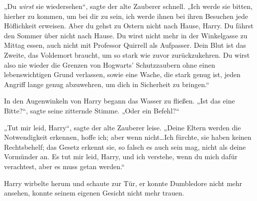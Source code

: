„Du \emph{wirst} sie wiedersehen“, sagte der alte Zauberer schnell. „Ich werde sie bitten, hierher zu kommen, um bei dir zu sein, ich werde ihnen bei ihren Besuchen jede Höflichkeit erweisen. Aber du gehst zu Ostern nicht nach Hause, Harry. Du fährst den Sommer über nicht nach Hause. Du wirst nicht mehr in der Winkelgasse zu Mittag essen, auch nicht mit Professor Quirrell als Aufpasser. Dein Blut ist das Zweite, das Voldemort braucht, um so stark wie zuvor zurückzukehren. Du wirst also nie wieder die Grenzen von Hogwarts’ Schutzzaubern ohne einen lebenswichtigen Grund verlassen, sowie eine Wache, die stark genug ist, jeden Angriff lange genug abzuwehren, um dich in Sicherheit zu bringen.“

In den Augenwinkeln von Harry begann das Wasser zu fließen. „Ist das eine Bitte?“, sagte seine zitternde Stimme. „Oder ein Befehl?“

„Tut mir leid, Harry“, sagte der alte Zauberer leise. „Deine Eltern werden die Notwendigkeit erkennen, hoffe ich; aber wenn nicht…Ich fürchte, sie haben keinen Rechtsbehelf; das Gesetz erkennt sie, so falsch es auch sein mag, nicht als deine Vormünder an. Es tut mir leid, Harry, und ich verstehe, wenn du mich dafür verachtest, aber es muss getan werden.“

Harry wirbelte herum und schaute zur Tür, er konnte Dumbledore nicht mehr ansehen, konnte seinem eigenen Gesicht nicht mehr trauen.

